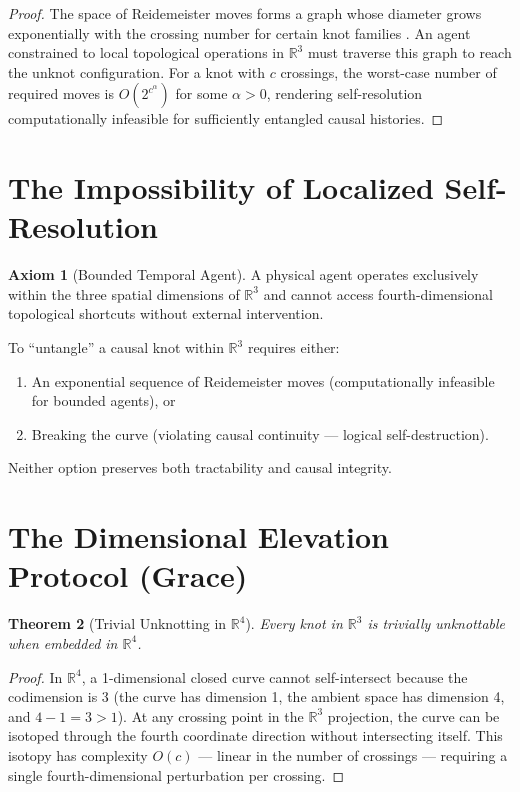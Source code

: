 \documentclass[12pt, a4paper]{article}
\theoremstyle{plain}
\newtheorem{theorem}{Theorem}[section]
\theoremstyle{definition}
\newtheorem{axiom}[theorem]{Axiom}
\theoremstyle{remark}
\begin{document}
\begin{proof}
The space of Reidemeister moves forms a graph whose diameter grows exponentially with the crossing number for certain knot families \citep{Hass1999}. An agent constrained to local topological operations in $\mathbb{R}^3$ must traverse this graph to reach the unknot configuration. For a knot with $c$ crossings, the worst-case number of required moves is $O(2^{c^{\alpha}})$ for some $\alpha > 0$, rendering self-resolution computationally infeasible for sufficiently entangled causal histories.
\end{proof}

\section{The Impossibility of Localized Self-Resolution}\label{sec:impossibility}

\begin{axiom}[Bounded Temporal Agent]
A physical agent operates exclusively within the three spatial dimensions of $\mathbb{R}^3$ and cannot access fourth-dimensional topological shortcuts without external intervention.
\end{axiom}

To ``untangle'' a causal knot within $\mathbb{R}^3$ requires either:
\begin{enumerate}
    \item An exponential sequence of Reidemeister moves (computationally infeasible for bounded agents), or
    \item Breaking the curve (violating causal continuity --- logical self-destruction).
\end{enumerate}

Neither option preserves both tractability and causal integrity.

\section{The Dimensional Elevation Protocol (Grace)}\label{sec:grace}

\begin{theorem}[Trivial Unknotting in $\mathbb{R}^4$]
Every knot in $\mathbb{R}^3$ is trivially unknottable when embedded in $\mathbb{R}^4$.
\end{theorem}

\begin{proof}
In $\mathbb{R}^4$, a 1-dimensional closed curve cannot self-intersect because the codimension is 3 (the curve has dimension 1, the ambient space has dimension 4, and $4 - 1 = 3 > 1$). At any crossing point in the $\mathbb{R}^3$ projection, the curve can be isotoped through the fourth coordinate direction without intersecting itself. This isotopy has complexity $O(c)$ --- linear in the number of crossings --- requiring a single fourth-dimensional perturbation per crossing.
\end{proof}
\end{document}
